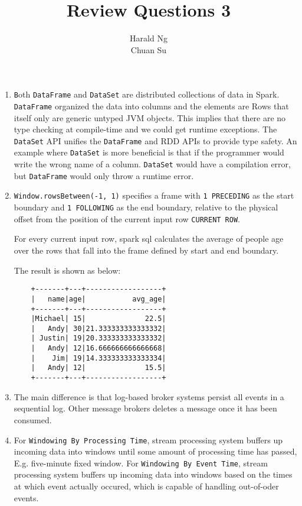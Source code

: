 \documentclass[12pt]{article}
\begin{document}
\title{Review Questions 3}
\author{Harald Ng \\
        Chuan Su}

\maketitle
\begin{enumerate}
    \item \texttt Both \texttt{DataFrame} and \texttt{DataSet} are distributed collections of data in Spark. \texttt{DataFrame} organized the data into columns and the elements are Rows that itself only are generic untyped JVM objects. This implies that there are no type checking at compile-time and we could get runtime exceptions. The \texttt{DataSet} API unifies the \texttt{DataFrame} and RDD APIs to provide type safety. An example where \texttt{DataSet} is more beneficial is that if the programmer would write the wrong name of a column. \texttt{DataSet} would have a compilation error, but \texttt{DataFrame} would only throw a runtime error.

    \item
       \texttt{Window.rowsBetween(-1, 1)} specifies a frame with \texttt{1 PRECEDING} as the start boundary and \texttt{1 FOLLOWING} as the end boundary, relative to the physical offset from the position of the current input row  \texttt{CURRENT ROW}.

    For every current input row, spark sql calculates the average of people age over the rows that fall into the frame defined by start and end boundary.

    The result is shown as below:
    \begin{verbatim}
    +-------+---+------------------+
    |   name|age|           avg_age|
    +-------+---+------------------+
    |Michael| 15|              22.5|
    |   Andy| 30|21.333333333333332|
    | Justin| 19|20.333333333333332|
    |   Andy| 12|16.666666666666668|
    |    Jim| 19|14.333333333333334|
    |   Andy| 12|              15.5|
    +-------+---+------------------+
    \end{verbatim}

    \item The main difference is that log-based broker systems persist all events in a sequential log. Other message brokers deletes a message once it has been consumed.

    \item For \texttt{Windowing By Processing Time}, stream processing system buffers up incoming data into windows until some amount of processing time has passed, E.g. five-minute fixed window. For \texttt{Windowing By Event Time}, stream processing system buffers up incoming data into windows based on the times at which event actually occured, which is capable of handling out-of-oder events.


\end{enumerate}
\end{document}
